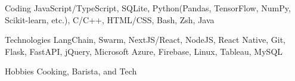 

\begin{cvskills}

  \cvskill
    {Coding} %
    {JavaScript/TypeScript, SQLite, Python(Pandas, TensorFlow, NumPy, Scikit-learn, etc.),  C/C++, HTML/CSS, Bash, Zsh, Java} %

  \cvskill
    {Technologies} %
    {LangChain, Swarm, NextJS/React, NodeJS, React Native, Git, Flask, FastAPI, jQuery, Microsoft Azure, Firebase, Linux, Tableau, MySQL} %
    
  \cvskill
    {Hobbies} %
    {Cooking, Barista, and Tech} %

\end{cvskills}
